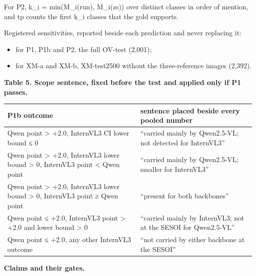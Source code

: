 \documentclass[manuscript,screen]{acmart}
\providecommand{\tightlist}{\setlength{\itemsep}{0pt}\setlength{\parskip}{0pt}}
\begin{document}
For P2, k\_i = min(\textbar M\_i(run)\textbar, \textbar M\_i(zs)\textbar) over distinct classes in
order of mention, and tp counts the first k\_i classes that the gold supports.

Registered sensitivities, reported beside each prediction and never replacing it:

\begin{itemize}
\tightlist
\item
  for P1, P1b and P2, the full OV-test (2,001);
\item
  for XM-a and XM-b, XM-test2500 without the three-reference images (2,392).
\end{itemize}

\textbf{Table 5. Scope sentence, fixed before the test and applied only if P1 passes.}

\begin{longtable}[]{@{}
  >{\raggedright\arraybackslash}p{}
  >{\raggedright\arraybackslash}p{}@{}}
\toprule\noalign{}
\begin{minipage}[b]{\linewidth}\raggedright
P1b outcome
\end{minipage} & \begin{minipage}[b]{\linewidth}\raggedright
sentence placed beside every pooled number
\end{minipage} \\
\midrule\noalign{}
\endhead
\bottomrule\noalign{}
\endlastfoot
Qwen point \textgreater{} +2.0, InternVL3 CI lower bound ≤ 0 & ``carried mainly by Qwen2.5-VL; not
detected for InternVL3'' \\
Qwen point \textgreater{} +2.0, InternVL3 lower bound \textgreater{} 0, InternVL3 point \textless{}
Qwen point & ``carried mainly by Qwen2.5-VL; smaller for InternVL3'' \\
Qwen point \textgreater{} +2.0, InternVL3 lower bound \textgreater{} 0, InternVL3 point ≥ Qwen point
& ``present for both backbones'' \\
Qwen point ≤ +2.0, InternVL3 point \textgreater{} +2.0 and lower bound \textgreater{} 0 & ``carried
mainly by InternVL3; not at the SESOI for Qwen2.5-VL'' \\
Qwen point ≤ +2.0, any other InternVL3 outcome & ``not carried by either backbone at the SESOI'' \\
\end{longtable}

\textbf{Claims and their gates.}
\end{document}
